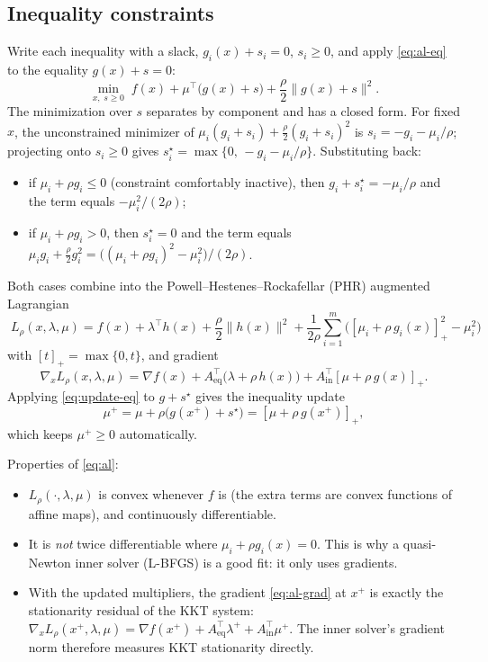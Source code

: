 \documentclass[11pt,a4paper]{article}
\newcommand{\Aeq}{A_{\mathrm{eq}}}
\newcommand{\Ain}{A_{\mathrm{in}}}
\newcommand{\norm}[1]{\lVert #1\rVert}
\newcommand{\pos}[1]{\left[#1\right]_+}
\begin{document}
\subsection{Inequality constraints}
Write each inequality with a slack, $g_i(x) + s_i = 0$, $s_i\ge 0$, and apply
\eqref{eq:al-eq} to the equality $g(x)+s=0$:
\[
  \min_{x,\; s\ge 0}\; f(x) + \mu^\top\big(g(x)+s\big) + \frac{\rho}{2}\norm{g(x)+s}^2 .
\]
The minimization over $s$ separates by component and has a closed form. For
fixed $x$, the unconstrained minimizer of
$\mu_i(g_i+s_i)+\tfrac{\rho}{2}(g_i+s_i)^2$ is $s_i=-g_i-\mu_i/\rho$; projecting
onto $s_i\ge 0$ gives $s_i^\star = \max\{0,\,-g_i-\mu_i/\rho\}$. Substituting back:
\begin{itemize}
  \item if $\mu_i+\rho g_i \le 0$ (constraint comfortably inactive), then
        $g_i+s_i^\star=-\mu_i/\rho$ and the term equals $-\mu_i^2/(2\rho)$;
  \item if $\mu_i+\rho g_i > 0$, then $s_i^\star=0$ and the term equals
        $\mu_i g_i+\tfrac{\rho}{2}g_i^2 = \big((\mu_i+\rho g_i)^2-\mu_i^2\big)/(2\rho)$.
\end{itemize}
Both cases combine into the Powell--Hestenes--Rockafellar (PHR) augmented
Lagrangian
\begin{equation}\label{eq:al}
  \boxed{\;
  L_\rho(x,\lambda,\mu) = f(x) + \lambda^\top h(x) + \frac{\rho}{2}\norm{h(x)}^2
  + \frac{1}{2\rho}\sum_{i=1}^m\Big(\pos{\mu_i+\rho\,g_i(x)}^2 - \mu_i^2\Big)
  \;}
\end{equation}
with $\pos{t}=\max\{0,t\}$, and gradient
\begin{equation}\label{eq:al-grad}
  \nabla_x L_\rho(x,\lambda,\mu)
  = \nabla f(x) + \Aeq^\top\big(\lambda+\rho\,h(x)\big) + \Ain^\top\pos{\mu+\rho\,g(x)} .
\end{equation}
Applying \eqref{eq:update-eq} to $g+s^\star$ gives the inequality update
\begin{equation}\label{eq:update-in}
  \mu^+ = \mu + \rho\big(g(x^+)+s^\star\big) = \pos{\mu + \rho\, g(x^+)} ,
\end{equation}
which keeps $\mu^+\ge 0$ automatically.

Properties of \eqref{eq:al}:
\begin{itemize}
  \item $L_\rho(\cdot,\lambda,\mu)$ is convex whenever $f$ is (the extra terms
        are convex functions of affine maps), and continuously differentiable.
  \item It is \emph{not} twice differentiable where $\mu_i+\rho g_i(x)=0$.
        This is why a quasi-Newton inner solver (L-BFGS) is a good fit: it
        only uses gradients.
  \item With the updated multipliers, the gradient
        \eqref{eq:al-grad} at $x^+$ is exactly the stationarity residual of the
        KKT system:
        $\nabla_x L_\rho(x^+,\lambda,\mu) = \nabla f(x^+)+\Aeq^\top\lambda^+ +\Ain^\top\mu^+$.
        The inner solver's gradient norm therefore measures KKT stationarity
        directly.
\end{itemize}
\end{document}
